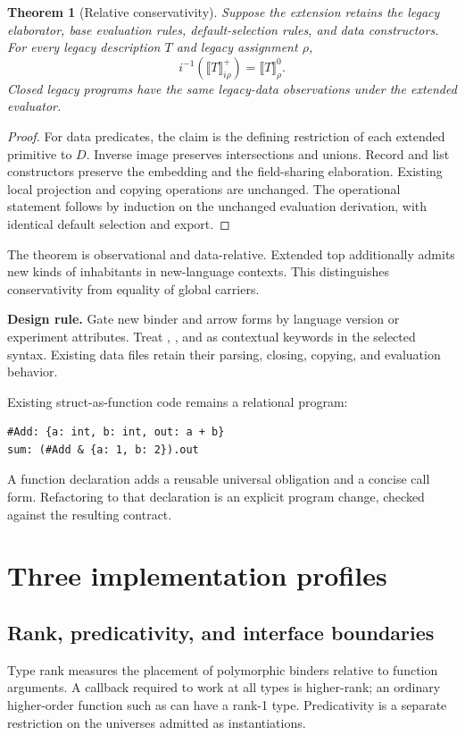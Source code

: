 \documentclass[11pt,a4paper,oneside]{report}
\newcommand{\code}[1]{\texttt{\detokenize{#1}}}
\newcommand{\sem}[1]{\llbracket #1\rrbracket}
\newtheorem{theorem}[definition]{Theorem}
\theoremstyle{remark}
\newcommand{\decision}[1]{\par\textbf{Design rule.} #1\par}
\begin{document}
\begin{theorem}[Relative conservativity]\label{thm:conservative}
Suppose the extension retains the legacy elaborator, base evaluation rules,
default-selection rules, and data constructors. For every legacy description
$T$ and legacy assignment $\rho$,
\[
 i^{-1}(\sem T^{+}_{i\rho})=\sem T^{0}_{\rho}.
\]
Closed legacy programs have the same legacy-data observations under the extended
evaluator.
\end{theorem}
\begin{proof}
For data predicates, the claim is the defining restriction of each extended
primitive to $D$. Inverse image preserves intersections and unions. Record and
list constructors preserve the embedding and the field-sharing elaboration.
Existing local projection and copying operations are unchanged. The operational
statement follows by induction on the unchanged evaluation derivation, with
identical default selection and export.
\end{proof}
The theorem is observational and data-relative. Extended top additionally
admits new kinds of inhabitants in new-language contexts. This distinguishes
conservativity from equality of global carriers.

\decision{Gate new binder and arrow forms by language version or experiment
attributes. Treat \code{forall}, \code{exists}, and \code{func} as contextual
keywords in the selected syntax. Existing data files retain their parsing,
closing, copying, and evaluation behavior.}

Existing struct-as-function code remains a relational program:
\par\noindent\begin{minipage}{\linewidth}
\begin{lstlisting}
#Add: {a: int, b: int, out: a + b}
sum: (#Add & {a: 1, b: 2}).out
\end{lstlisting}
\end{minipage}\par
A function declaration adds a reusable universal obligation and a concise call
form. Refactoring to that declaration is an explicit program change, checked
against the resulting contract.

\chapter{Three implementation profiles}
\label{ch:profiles}
\section{Rank, predicativity, and interface boundaries}
Type rank measures the placement of polymorphic binders relative to function
arguments. A callback required to work at all types is higher-rank; an ordinary
higher-order function such as \code{map} can have a rank-1 type. Predicativity is
a separate restriction on the universes admitted as instantiations.
\end{document}
